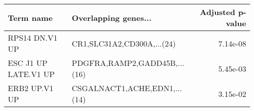 \begin{tabular}{llr}
\toprule
           Term name &         Overlapping genes... &  Adjusted p-value \\
\midrule
      RPS14 DN.V1 UP &   CR1,SLC31A2,CD300A,...(24) &          7.14e-08 \\
ESC J1 UP LATE.V1 UP & PDGFRA,RAMP2,GADD45B,...(16) &          5.45e-03 \\
       ERB2 UP.V1 UP & CSGALNACT1,ACHE,EDN1,...(14) &          3.15e-02 \\
\bottomrule
\end{tabular}
